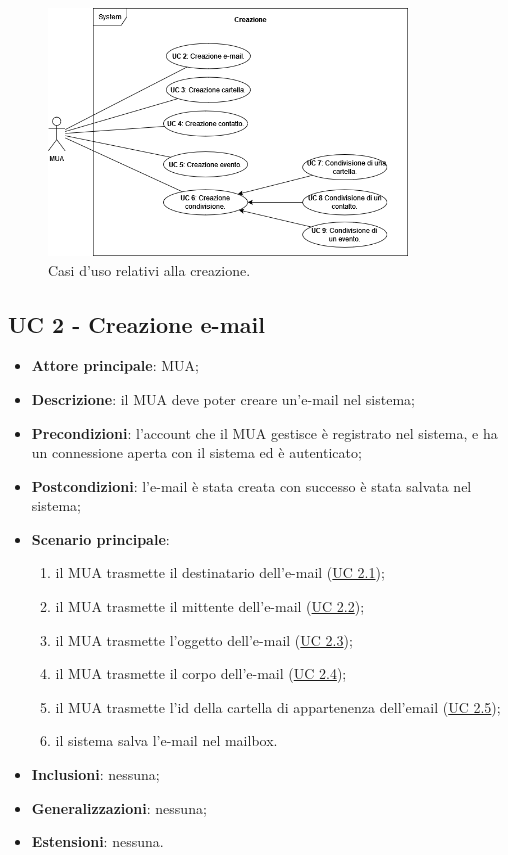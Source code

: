 

\begin{figure}[H]
    \includegraphics[width=0.85\textwidth]{sections/uc_imgs/UC-creazione.png}
    \centering
    \caption{Casi d'uso relativi alla creazione.}
\end{figure}

\subsection{UC 2 - Creazione e-mail} \label{sec:UC2}

    \begin{itemize}
        \item \textbf{Attore principale}: MUA;
        \item \textbf{Descrizione}: il MUA deve poter creare un'e-mail nel sistema;
        \item \textbf{Precondizioni}: l’account che il MUA gestisce è registrato nel sistema, e ha un connessione aperta con il sistema ed è autenticato;
        \item \textbf{Postcondizioni}: l'e-mail è stata creata con successo è stata salvata nel sistema;
        \item \textbf{Scenario principale}:
            \begin{enumerate}
                \item il MUA trasmette il destinatario dell'e-mail (\hyperref[sec:UC2.1]{UC 2.1});
                \item il MUA trasmette il mittente dell'e-mail (\hyperref[sec:UC2.2]{UC 2.2});
                \item il MUA trasmette l'oggetto dell'e-mail (\hyperref[sec:UC2.3]{UC 2.3});
                \item il MUA trasmette il corpo dell'e-mail (\hyperref[sec:UC2.4]{UC 2.4});
                \item il MUA trasmette l'id della cartella di appartenenza dell'email (\hyperref[sec:UC2.5]{UC 2.5});
                \item il sistema salva l'e-mail nel mailbox.
            \end{enumerate}
        \item \textbf{Inclusioni}: nessuna;
        \item \textbf{Generalizzazioni}: nessuna;
        \item \textbf{Estensioni}: nessuna.
    \end{itemize}

